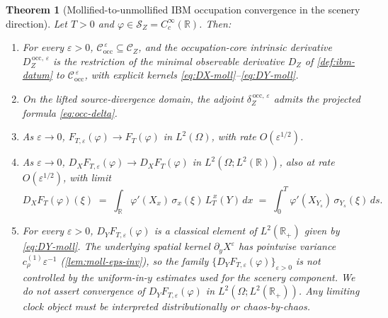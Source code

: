 \documentclass[11pt,reqno]{amsart}
\theoremstyle{plain}
\newtheorem{theorem}{Theorem}[section]
\theoremstyle{definition}
\theoremstyle{remark}
\newcommand{\R}{\mathbb{R}}
\newcommand{\IBM}{Z}
\begin{document}
\begin{theorem}[Mollified-to-unmollified IBM occupation convergence in the scenery direction]
\label{thm:ibm-occ}
Let $T>0$ and $\varphi\in\mathscr S_\IBM=C_c^\infty(\R)$. Then:
\begin{enumerate}
\item For every $\varepsilon>0$,
  $\mathcal C_{\mathrm{occ}}^{\,\varepsilon}\subseteq\mathcal C_\IBM$,
  and the occupation-core intrinsic derivative
  $D_\IBM^{\,\mathrm{occ},\,\varepsilon}$ is the restriction of the
  minimal observable derivative $D_\IBM$ of \cref{def:ibm-datum} to
  $\mathcal C_{\mathrm{occ}}^{\,\varepsilon}$, with explicit kernels
  \eqref{eq:DX-moll}--\eqref{eq:DY-moll}.
\item On the lifted source-divergence domain, the adjoint
  $\delta_\IBM^{\,\mathrm{occ},\,\varepsilon}$ admits the projected
  formula \eqref{eq:occ-delta}.
\item As $\varepsilon\to 0$,
  $F_{T,\varepsilon}(\varphi)\to F_T(\varphi)$ in $L^{2}(\Omega)$, with
  rate $O(\varepsilon^{1/2})$.
\item As $\varepsilon\to 0$,
  $D_X F_{T,\varepsilon}(\varphi)\to D_X F_T(\varphi)$ in
  $L^{2}(\Omega;L^{2}(\R))$, also at rate $O(\varepsilon^{1/2})$, with
  limit
  \begin{equation}\label{eq:DX-limit}
    D_X F_T(\varphi)(\xi)
    \;=\;\int_{\R}\varphi'(X_x)\,\sigma_x(\xi)\,L_T^{\,x}(Y)\,dx
    \;=\;\int_0^T\varphi'(X_{Y_s})\,\sigma_{Y_s}(\xi)\,ds.
  \end{equation}
\item For every $\varepsilon>0$, $D_Y F_{T,\varepsilon}(\varphi)$ is a
  classical element of $L^{2}(\R_{+})$ given by \eqref{eq:DY-moll}. The
  underlying spatial kernel $\partial_yX^\varepsilon$ has pointwise
  variance $c_\rho^{(1)}\varepsilon^{-1}$ (\cref{lem:moll-eps-inv}), so
  the family $\{D_YF_{T,\varepsilon}(\varphi)\}_{\varepsilon>0}$ is not
  controlled by the uniform-in-$y$ estimates used for the scenery
  component. We do not assert convergence of
  $D_Y F_{T,\varepsilon}(\varphi)$ in $L^{2}(\Omega;L^{2}(\R_{+}))$.
  Any limiting clock object must be interpreted distributionally or
  chaos-by-chaos.
\end{enumerate}
\end{theorem}
\end{document}
